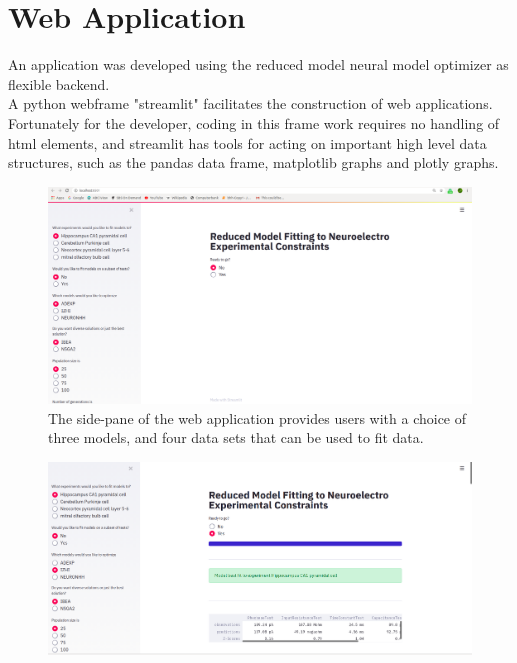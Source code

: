 \section{Web Application}
An application was developed using the reduced model neural model optimizer as flexible backend. %
\\
A python webframe "streamlit" facilitates the construction of web applications. Fortunately for the developer, coding in this frame work requires no handling of html elements, and streamlit has tools for acting on important high level data structures, such as the pandas data frame, matplotlib graphs and plotly graphs.\\
\begin{figure}
\begin{center}

\includegraphics[scale=0.5]{chapters/app_tex/web_app_thesis}
\caption{The side-pane of the web application provides users with a choice of three models, and four data sets that can be used to fit data.
}
\end{center}

\end{figure}
\begin{figure}
\begin{center}

\includegraphics[scale=0.5]{chapters/app_tex/app_results}
\end{center}

\end{figure}

